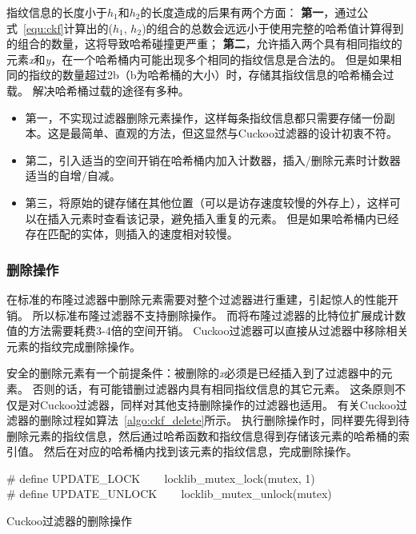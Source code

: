 指纹信息的长度小于$h_1$和$h_2$的长度造成的后果有两个方面：
\textbf{第一}，通过公式~\ref{equ:ckf}计算出的($h_1$, $h_2$)的组合的总数会远远小于使用完整的哈希值计算得到的组合的数量，这将导致哈希碰撞更严重；
\textbf{第二}，允许插入两个具有相同指纹的元素\textit{x}和\textit{y}，在一个哈希桶内可能出现多个相同的指纹信息是合法的。
但是如果相同的指纹的数量超过2b（b为哈希桶的大小）时，存储其指纹信息的哈希桶会过载。
解决哈希桶过载的途径有多种。
\begin{itemize}
	\item 第一，不实现过滤器删除元素操作，这样每条指纹信息都只需要存储一份副本。这是最简单、直观的方法，但这显然与Cuckoo过滤器的设计初衷不符。
	\item 第二，引入适当的空间开销在哈希桶内加入计数器，插入/删除元素时计数器适当的自增/自减。
	\item 第三，将原始的键存储在其他位置（可以是访存速度较慢的外存上），这样可以在插入元素时查看该记录，避免插入重复的元素。
	但是如果哈希桶内已经存在匹配的实体，则插入的速度相对较慢。
\end{itemize}	

\subsubsection{删除操作}
在标准的布隆过滤器中删除元素需要对整个过滤器进行重建，引起惊人的性能开销。
所以标准布隆过滤器不支持删除操作。
而将布隆过滤器的比特位扩展成计数值的方法需要耗费3-4倍的空间开销。
Cuckoo过滤器可以直接从过滤器中移除相关元素的指纹完成删除操作。

安全的删除元素有一个前提条件：被删除的\textit{x}必须是已经插入到了过滤器中的元素。
否则的话，有可能错删过滤器内具有相同指纹信息的其它元素。
这条原则不仅是对Cuckoo过滤器，同样对其他支持删除操作的过滤器也适用。
有关Cuckoo过滤器的删除过程如算法~\ref{algo:ckf_delete}所示。
执行删除操作时，同样要先得到待删除元素的指纹信息，然后通过哈希函数和指纹信息得到存储该元素的哈希桶的索引值。
然后在对应的哈希桶内找到该元素的指纹信息，完成删除操作。

\begin{algorithm}[htbp]
\SetAlgoLined
\# define UPDATE\_LOCK ~~~ locklib\_mutex\_lock(mutex, 1)\\
\# define UPDATE\_UNLOCK ~~~ locklib\_mutex\_unlock(mutex)\\
\caption{Cuckoo过滤器的删除操作}
\label{algo:ckf_delete}
\end{algorithm}

